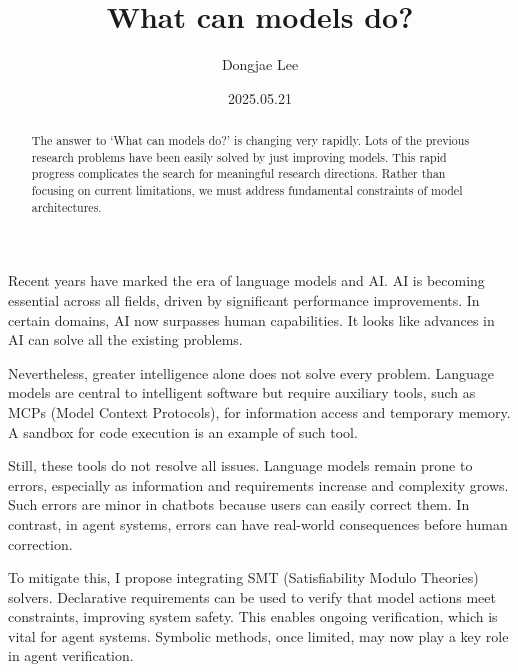 \documentclass[11pt, oneside]{article}
\title{What can models do?}
\author{Dongjae Lee}
\date{2025.05.21}
\begin{document}
\maketitle

\begin{abstract}
	The answer to `What can models do?' is changing very rapidly.
	Lots of the previous research problems have been easily solved by just improving models.
	This rapid progress complicates the search for meaningful research directions.
	Rather than focusing on current limitations, we must address fundamental constraints of model architectures.
\end{abstract}

Recent years have marked the era of language models and AI.
AI is becoming essential across all fields, driven by significant performance improvements.
In certain domains, AI now surpasses human capabilities.
It looks like advances in AI can solve all the existing problems.

Nevertheless, greater intelligence alone does not solve every problem.
Language models are central to intelligent software but require auxiliary tools, such as MCPs (Model Context Protocols), for information access and temporary memory.
A sandbox for code execution is an example of such tool.

Still, these tools do not resolve all issues.
Language models remain prone to errors, especially as information and requirements increase and complexity grows.
Such errors are minor in chatbots because users can easily correct them.
In contrast, in agent systems, errors can have real-world consequences before human correction.

To mitigate this, I propose integrating SMT (Satisfiability Modulo Theories) solvers.
Declarative requirements can be used to verify that model actions meet constraints, improving system safety.
This enables ongoing verification, which is vital for agent systems.
Symbolic methods, once limited, may now play a key role in agent verification.
\end{document}
